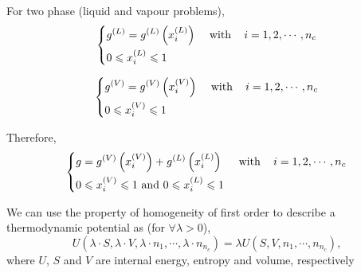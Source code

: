 For two phase (liquid and vapour problems),
\begin{displaymath}
  \left \{
  \begin{aligned}
    & \mfr[g]{}{L} = \mfr[g]{}{L}\left(\mfr[x]{i}{L}\right) && \text{ with } \;\;\;i = 1, 2, \cdots, n_{c} \\
    & 0 \leq \mfr[x]{i}{L} \leq 1 
  \end{aligned} \right.
\end{displaymath} 

\begin{displaymath}
  \left \{
  \begin{aligned}
    & \mfr[g]{}{V} = \mfr[g]{}{V}\left(\mfr[x]{i}{V}\right) && \text{ with } \;\;\;i = 1, 2, \cdots, n_{c} \\
    & 0 \leq \mfr[x]{i}{V} \leq 1 
  \end{aligned} \right.
\end{displaymath} 

Therefore,
\begin{equation}
  \left \{
  \begin{aligned}
    & g = \mfr[g]{}{V}\left(\mfr[x]{i}{V}\right) + \mfr[g]{}{L}\left(\mfr[x]{i}{L}\right) && \text{ with } \;\;\;i = 1, 2, \cdots, n_{c} \\
    & 0 \leq \mfr[x]{i}{V} \leq 1 \text{ and } 0 \leq \mfr[x]{i}{L} \leq 1 
  \end{aligned} \right.
\end{equation} 

We can use the property of homogeneity of first order to describe a thermodynamic potential as (for $\forall\lambda > 0$),
\begin{displaymath}
   U\left(\lambda\cdot S, \lambda\cdot V,  \lambda\cdot n_{1}, \cdots, \lambda\cdot n_{n_{c}}\right) = \lambda U\left(S, V, n_{1}, \cdots, n_{n_{c}}\right),
\end{displaymath}
where $U$, $S$ and $V$ are internal energy, entropy and volume, respectively

